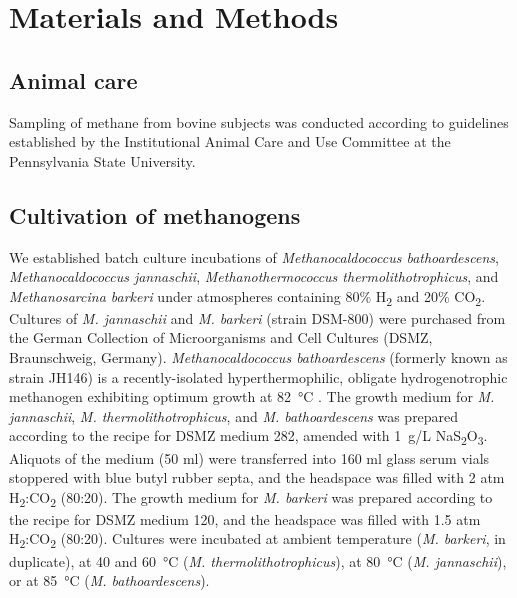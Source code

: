 \section{Materials and Methods}\label{materials-and-methods}

\subsection{Animal care }\label{animal-care}

Sampling of methane from bovine subjects was conducted according to
guidelines established by the Institutional Animal Care and Use
Committee at the Pennsylvania State University.

\subsection{Cultivation of methanogens
}\label{cultivation-of-methanogens}

We established batch culture incubations of \emph{Methanocaldococcus
bathoardescens}, \emph{Methanocaldococcus jannaschii}, \emph{Methanothermococcus
thermolithotrophicus}, and \emph{Methanosarcina barkeri} under atmospheres
containing 80\% H\textsubscript{2} and 20\% CO\textsubscript{2}.
Cultures of \emph{M. jannaschii} \parencite{Jones++_1983_AoM} and \emph{M. barkeri} (strain DSM-800) \parencite{Balch++_1979_MR} were
purchased from the German Collection of Microorganisms and Cell Cultures
(DSMZ, Braunschweig, Germany). \emph{Methanocaldococcus bathoardescens}
(formerly known as strain JH146) is a recently-isolated
hyperthermophilic, obligate hydrogenotrophic methanogen exhibiting
optimum growth at 82~°C \parencite{Stewart++_2015_IJSEM,VerEecke++_2013_EMR}. The growth medium for \emph{M. jannaschii}, \emph{M.
thermolithotrophicus}, and \emph{M. bathoardescens} was prepared according to
the recipe for DSMZ medium 282, amended with 1~g/L
NaS\textsubscript{2}O\textsubscript{3}. Aliquots of the medium (50 ml)
were transferred into 160 ml glass serum vials stoppered with blue butyl
rubber septa, and the headspace was filled with 2 atm
H\textsubscript{2}:CO\textsubscript{2} (80:20). The growth medium for \emph{M.
barkeri} was prepared according to the recipe for DSMZ medium 120, and
the headspace was filled with 1.5 atm
H\textsubscript{2}:CO\textsubscript{2} (80:20). Cultures were incubated
at ambient temperature (\emph{M. barkeri}, in duplicate), at 40 and 60~°C (\emph{M.
thermolithotrophicus}), at 80~°C (\emph{M. jannaschii}), or at 85~°C (\emph{M.
bathoardescens}).


